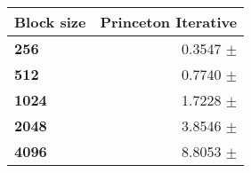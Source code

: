 \begin{tabular}{lr}\toprule
\textbf{Block size}  & \textbf{Princeton Iterative}\\\midrule
\textbf{256}  & 0.3547 $\pm$ \\
\textbf{512}  & 0.7740 $\pm$ \\
\textbf{1024}  & 1.7228 $\pm$ \\
\textbf{2048}  & 3.8546 $\pm$ \\
\textbf{4096} & 8.8053 $\pm$ \\
\bottomrule
\end{tabular}
